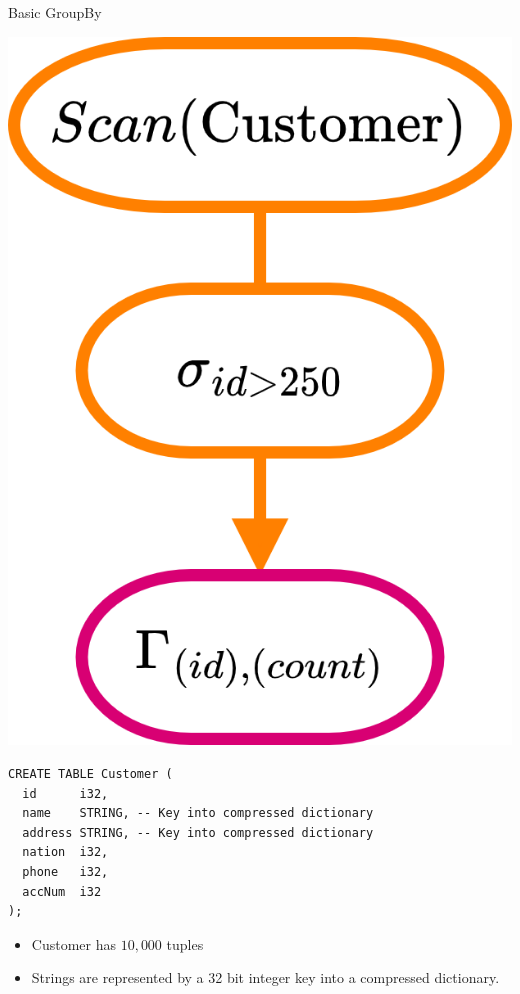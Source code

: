 \begin{examplebox}{Basic GroupBy}
  \begin{minipage}{.2\textwidth}
    \includegraphics[width=\textwidth]{processing_models/images/example_buffer_io_1.drawio.png}
  \end{minipage} \hfill \begin{minipage}{.79\textwidth}
    \begin{verbatim}
CREATE TABLE Customer (
  id      i32,
  name    STRING, -- Key into compressed dictionary
  address STRING, -- Key into compressed dictionary
  nation  i32,
  phone   i32,
  accNum  i32
);
    \end{verbatim}
    \begin{itemize}
      \item Customer has $10,000$ tuples
      \item Strings are represented by a 32 bit integer key into a compressed dictionary.

\end{itemize}
\end{minipage}
\end{examplebox}
